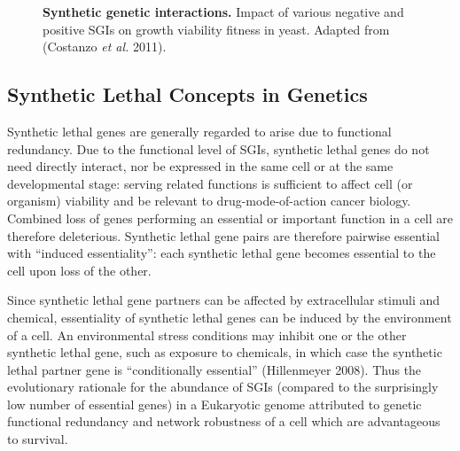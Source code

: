 \begin{figure}[!ht]
   \centering
   \caption{\textbf{Synthetic genetic interactions.} Impact of various negative and positive SGIs on growth viability fitness in yeast. Adapted from (Costanzo\textit{ et al.} 2011).}
\label{fig:Costanzo2011}
\end{figure}

\subsection{Synthetic Lethal Concepts in Genetics}

Synthetic lethal genes are generally regarded to arise due to functional redundancy. Due to the functional level of SGIs, synthetic lethal genes do not need directly interact, nor be expressed in the same cell or at the same developmental stage: serving related functions is sufficient to affect cell (or organism) viability and be relevant to drug-mode-of-action cancer biology. Combined loss of genes performing an essential or important function in a cell are therefore deleterious. Synthetic lethal gene pairs are therefore pairwise essential with ``induced essentiality'': each synthetic lethal gene becomes essential to the cell upon loss of the other.

Since synthetic lethal gene partners can be affected by extracellular stimuli and chemical, essentiality of synthetic lethal genes can be induced by the environment of a cell.  An environmental stress conditions may inhibit one or the other synthetic lethal gene, such as exposure to chemicals, in which case the synthetic lethal partner gene is ``conditionally essential'' (Hillenmeyer 2008). Thus the evolutionary rationale for the abundance of SGIs (compared to the surprisingly low number of essential genes) in a Eukaryotic genome attributed to genetic functional redundancy and network robustness of a cell which are advantageous to survival. 

